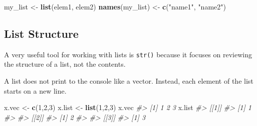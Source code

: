 \documentclass[]{book}
\newenvironment{Shaded}{\begin{snugshade}}{\end{snugshade}}
\newcommand{\KeywordTok}[1]{\textcolor[rgb]{0.13,0.29,0.53}{\textbf{#1}}}
\newcommand{\DataTypeTok}[1]{\textcolor[rgb]{0.13,0.29,0.53}{#1}}
\newcommand{\DecValTok}[1]{\textcolor[rgb]{0.00,0.00,0.81}{#1}}
\newcommand{\StringTok}[1]{\textcolor[rgb]{0.31,0.60,0.02}{#1}}
\newcommand{\CommentTok}[1]{\textcolor[rgb]{0.56,0.35,0.01}{\textit{#1}}}
\newcommand{\OperatorTok}[1]{\textcolor[rgb]{0.81,0.36,0.00}{\textbf{#1}}}
\newcommand{\NormalTok}[1]{#1}
\begin{document}
\begin{Shaded}
\begin{Highlighting}[]
\NormalTok{my_list <-}\StringTok{ }\KeywordTok{list}\NormalTok{(elem1, elem2)}
\KeywordTok{names}\NormalTok{(my_list) <-}\StringTok{ }\KeywordTok{c}\NormalTok{(}\StringTok{"name1"}\NormalTok{, }\StringTok{"name2"}\NormalTok{)}
\end{Highlighting}
\end{Shaded}

\subsection{List Structure}\label{list-structure}

A very useful tool for working with lists is \texttt{str()} because it
focuses on reviewing the structure of a list, not the contents.

\begin{Shaded}
\end{Shaded}

A list does not print to the console like a vector. Instead, each
element of the list starts on a new line.

\begin{Shaded}
\begin{Highlighting}[]
\NormalTok{x.vec <-}\StringTok{ }\KeywordTok{c}\NormalTok{(}\DecValTok{1}\NormalTok{,}\DecValTok{2}\NormalTok{,}\DecValTok{3}\NormalTok{)}
\NormalTok{x.list <-}\StringTok{ }\KeywordTok{list}\NormalTok{(}\DecValTok{1}\NormalTok{,}\DecValTok{2}\NormalTok{,}\DecValTok{3}\NormalTok{)}
\NormalTok{x.vec}
\CommentTok{#> [1] 1 2 3}
\NormalTok{x.list}
\CommentTok{#> [[1]]}
\CommentTok{#> [1] 1}
\CommentTok{#> }
\CommentTok{#> [[2]]}
\CommentTok{#> [1] 2}
\CommentTok{#> }
\CommentTok{#> [[3]]}
\CommentTok{#> [1] 3}
\end{Highlighting}
\end{Shaded}
\end{document}
